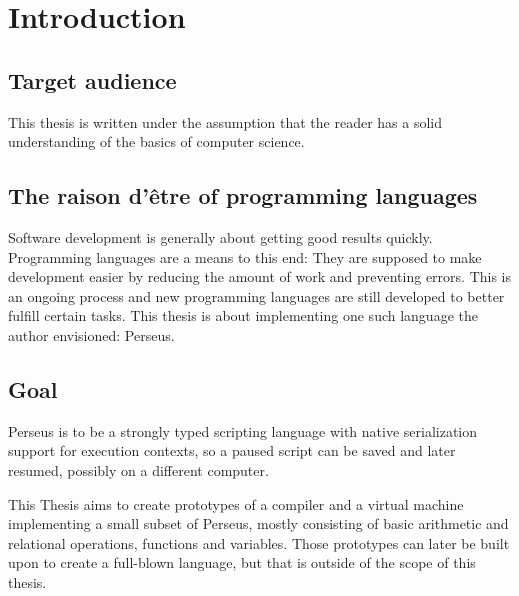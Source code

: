 
\chapter{Introduction} %


    
    \section{Target audience}
    This thesis is written under the assumption that the reader has a solid understanding of the basics of computer science.
    
	\section{The raison d'être of programming languages}
	
	Software development is generally about getting good results quickly. Programming languages are a means to this end: They are supposed to make development easier by reducing the amount of work and preventing errors. This is an ongoing process and new programming languages are still developed to better fulfill certain tasks. This thesis is about implementing one such language the author envisioned: Perseus.

	\section{Goal} %
	
	Perseus is to be a strongly typed scripting language with native serialization support for execution contexts, so a paused script can be saved and later resumed, possibly on a different computer.
	
	This Thesis aims to create prototypes of a compiler and a virtual machine implementing a small subset of Perseus, mostly consisting of basic arithmetic and relational operations, functions and variables. Those prototypes can later be built upon to create a full-blown language, but that is outside of the scope of this thesis.
	
